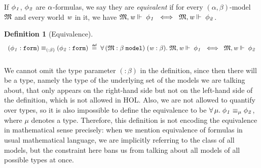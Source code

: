 \documentclass{llncs}
\newtheorem{defn}{Definition}[chapter]
\newenvironment{holmath}{\begin{displaymath}\begin{array}{l}}{\end{array}\end{displaymath}\ignorespacesafterend}
\renewcommand{\HOLinline}[1]{\ensuremath{#1}}
\begin{document}
If \HOLinline{\HOLFreeVar{\ensuremath{\phi\sb{1}}}}, \HOLinline{\HOLFreeVar{\ensuremath{\phi\sb{2}}}} are \HOLinline{\HOLFreeVar{\ensuremath{\alpha}}}-formulas, we say they are \emph{equivalent} if for every $(\alpha,\beta)$-model \HOLinline{\HOLFreeVar{\ensuremath{\mathfrak{M}}}} and every world \HOLinline{\HOLFreeVar{w}} in it, we have \HOLinline{\HOLFreeVar{\ensuremath{\mathfrak{M}}},\HOLFreeVar{w}\ensuremath{\Vdash}\;\HOLFreeVar{\ensuremath{\phi\sb{1}}}\;\HOLSymConst{\HOLTokenEquiv{}}\;\HOLFreeVar{\ensuremath{\mathfrak{M}}},\HOLFreeVar{w}\ensuremath{\Vdash}\;\HOLFreeVar{\ensuremath{\phi\sb{2}}}}.
\begin{defn}[Equivalence]
\begin{holmath}
  (\HOLFreeVar{\ensuremath{\phi\sb{1}}} :\HOLTyOp{form})\equiv\sb{({:}\ensuremath{\beta})}(\HOLFreeVar{\ensuremath{\phi\sb{2}}} :\HOLTyOp{form})\;\HOLTokenDefEquality{}\;\HOLSymConst{\HOLTokenForall{}}(\HOLBoundVar{\ensuremath{\mathfrak{M}}} :\ensuremath{\beta}\;\HOLTyOp{model})\;(\HOLBoundVar{w} :\ensuremath{\beta}).\;\HOLBoundVar{\ensuremath{\mathfrak{M}}},\HOLBoundVar{w}\ensuremath{\Vdash}\;\HOLFreeVar{\ensuremath{\phi\sb{1}}}\;\HOLSymConst{\HOLTokenEquiv{}}\;\HOLBoundVar{\ensuremath{\mathfrak{M}}},\HOLBoundVar{w}\ensuremath{\Vdash}\;\HOLFreeVar{\ensuremath{\phi\sb{2}}}\\[3mm]
\end{holmath}
\end{defn}
We cannot omit the type parameter \HOLinline{({:}\ensuremath{\beta})} in the definition, since then there will be a type, namely the type of the underlying set of the models we are talking about, that only appears on the right-hand side but not on the left-hand side of the definition, which is not allowed in HOL. Also, we are not allowed to quantify over types, so it is also impossible to define the equivalence to be \HOLinline{\HOLSymConst{\HOLTokenForall{}}\HOLBoundVar{\ensuremath{\mu}}.\;\HOLFreeVar{\ensuremath{\phi\sb{1}}}\equiv\sb{\HOLBoundVar{\ensuremath{\mu}}}\HOLFreeVar{\ensuremath{\phi\sb{2}}}}, where $\mu$ denotes a type. Therefore, this definition is not encoding the equivalence in mathematical sense precisely: when we mention equivalence of formulas in usual mathematical language, we are implicitly referring to the class of all models, but the constraint here bans us from talking about all models of all possible types at once.
\end{document}
